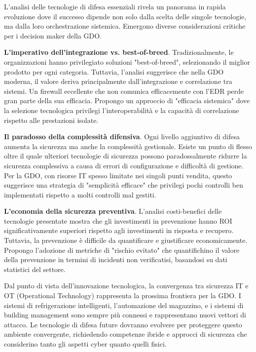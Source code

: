 {L'analisi delle tecnologie di difesa essenziali rivela un panorama in rapida evoluzione dove il successo dipende non solo dalla scelta delle singole tecnologie, ma dalla loro orchestrazione sistemica. Emergono diverse considerazioni critiche per i decision maker della GDO.

\textbf{L'imperativo dell'integrazione vs. best-of-breed}. Tradizionalmente, le organizzazioni hanno privilegiato soluzioni "best-of-breed", selezionando il miglior prodotto per ogni categoria. Tuttavia, l'analisi suggerisce che nella GDO moderna, il valore deriva principalmente dall'integrazione e correlazione tra sistemi. Un firewall eccellente che non comunica efficacemente con l'EDR perde gran parte della sua efficacia. Propongo un approccio di "efficacia sistemica" dove la selezione tecnologica privilegi l'interoperabilità e la capacità di correlazione rispetto alle prestazioni isolate.

\textbf{Il paradosso della complessità difensiva}. Ogni livello aggiuntivo di difesa aumenta la sicurezza ma anche la complessità gestionale. Esiste un punto di flesso oltre il quale ulteriori tecnologie di sicurezza possono paradossalmente ridurre la sicurezza complessiva a causa di errori di configurazione e difficoltà di gestione. Per la GDO, con risorse IT spesso limitate nei singoli punti vendita, questo suggerisce una strategia di "semplicità efficace" che privilegi pochi controlli ben implementati rispetto a molti controlli mal gestiti.

\textbf{L'economia della sicurezza preventiva}. L'analisi costi-benefici delle tecnologie presentate mostra che gli investimenti in prevenzione hanno ROI significativamente superiori rispetto agli investimenti in risposta e recupero. Tuttavia, la prevenzione è difficile da quantificare e giustificare economicamente. Propongo l'adozione di metriche di "rischio evitato" che quantifichino il valore della prevenzione in termini di incidenti non verificatisi, basandosi su dati statistici del settore.

Dal punto di vista dell'innovazione tecnologica, la convergenza tra sicurezza IT e OT (Operational Technology) rappresenta la prossima frontiera per la GDO. I sistemi di refrigerazione intelligenti, l'automazione del magazzino, e i sistemi di building management sono sempre più connessi e rappresentano nuovi vettori di attacco. Le tecnologie di difesa future dovranno evolvere per proteggere questo ambiente convergente, richiedendo competenze ibride e approcci di sicurezza che considerino tanto gli aspetti cyber quanto quelli fisici.

}

